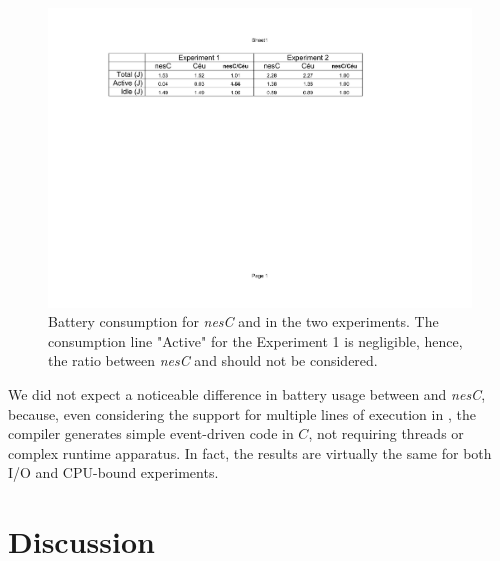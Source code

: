 \begin{figure}[t]
\includegraphics[width=\textwidth,clip=true,trim=120px 415px 210px 90px]{batt}
\caption{ Battery consumption for \emph{nesC} and \CEU in the two experiments.
\newline
{\small %
The consumption line "Active" for the Experiment 1 is negligible, hence, the 
ratio between \emph{nesC} and \CEU should not be considered.
}%
\label{fig.batt}
}
\end{figure}

We did not expect a noticeable difference in battery usage between \CEU and 
\emph{nesC}, because, even considering the support for multiple lines of 
execution in \CEU, the compiler generates simple event-driven code in $C$, not 
requiring threads or complex runtime apparatus.
%
In fact, the results are virtually the same for both I/O and CPU-bound 
experiments.

\section{Discussion}

